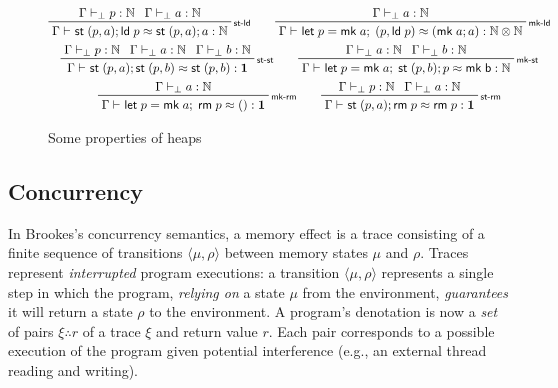 \documentclass[acmsmall,screen,review]{acmart}
\newcommand{\mb}[1]{\ensuremath{\mathbf{#1}}}
\newcommand{\ms}[1]{\ensuremath{\mathsf{#1}}}
\newcommand{\nats}{\mathbb{N}}
\newcommand{\letexpr}[3]{\ensuremath{\ms{let}\;#1 = #2;\;#3}}
\newcommand{\rle}[1]{{\scriptsize\textsf{#1}}}
\newcommand{\hasty}[4]{#1 \vdash_{#2} #3: {#4}}
\newcommand{\teqv}{\approx}
\newcommand{\tmeq}[5]{#1 \vdash_{#2} #3 \teqv #4 : {#5}}
\newcommand{\tret}[2]{#1 \therefore #2}
\begin{document}
\begin{figure}
  \begin{adjustbox}{minipage=1.1\textwidth,scale=0.9}
  \begin{gather*}
    \prftree[r]{\rle{st-ld}}
      {\hasty{\Gamma}{\bot}{p}{\nats}}
      {\hasty{\Gamma}{\bot}{a}{\nats}}
      {\tmeq{\Gamma}{}{\ms{st}\;(p, a) ; \ms{ld}\;p}{\ms{st}\;(p, a) ; a}{\nats}}
    \qquad
    \prftree[r]{\rle{mk-ld}}
      {\hasty{\Gamma}{\bot}{a}{\nats}}
      {\tmeq{\Gamma}{}{\letexpr{p}{\ms{mk}\;a}{(p, \ms{ld}\;p)}}
                                                 {(\ms{mk}\;a; a)}
                                                 {\nats \otimes \nats}}
    \\
    \prftree[r]{\rle{st-st}}
      {\hasty{\Gamma}{\bot}{p}{\nats}}
      {\hasty{\Gamma}{\bot}{a}{\nats}}
      {\hasty{\Gamma}{\bot}{b}{\nats}}
      {\tmeq{\Gamma}{}{\ms{st}\;(p, a) ; \ms{st}\;(p, b)}{\ms{st}\;(p, b)}{\mb{1}}}
    \qquad
    \prftree[r]{\rle{mk-st}}
      {\hasty{\Gamma}{\bot}{a}{\nats}}
      {\hasty{\Gamma}{\bot}{b}{\nats}}
      {\tmeq{\Gamma}{}{\letexpr{p}{\ms{mk}\;a}{\ms{st}\;(p, b) ; p}}
                                                  {\ms{mk\;b}}
                                                  {\nats}}
    \\
    \prftree[r]{\rle{mk-rm}}
      {\hasty{\Gamma}{\bot}{a}{\nats}}
      {\tmeq{\Gamma}{}{\letexpr{p}{\ms{mk}\;a}{\ms{rm}\;p}}{()}{\mb{1}}}
    \qquad
    \prftree[r]{\rle{st-rm}}
      {\hasty{\Gamma}{\bot}{p}{\nats}}
      {\hasty{\Gamma}{\bot}{a}{\nats}}
      {\tmeq{\Gamma}{}{\ms{st}\;(p, a) ; \ms{rm}\;p}{\ms{rm}\;p}{\mb{1}}}
    \\
  \end{gather*}
  \end{adjustbox}
  \caption{Some properties of heaps}
  \label{fig:heap-eqns}
  \Description{}
\end{figure}

\subsection{Concurrency}

In Brookes's \cite{brookes-full-abstraction-96} concurrency semantics, a memory effect
is a trace consisting of a finite sequence of transitions $\langle \mu, \rho \rangle$ 
between memory states $\mu$ and $\rho$.
%
Traces represent \emph{interrupted} program executions: a transition $\langle \mu, \rho
\rangle$ represents a single step in which the program, \emph{relying on} a state $\mu$ from the
environment, \emph{guarantees} it will return a state $\rho$ to the environment.
%
A program's denotation is now a \emph{set} of pairs $\tret{\xi}{r}$ of a trace $\xi$ and
return value $r$. Each pair corresponds to a possible execution of the program
given potential interference (e.g., an external thread reading and writing).
\end{document}
